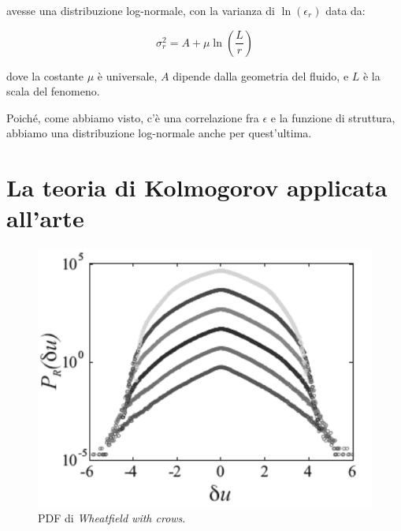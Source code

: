 \documentclass[12pt,a4paper]{article}
\numberwithin{equation}{section}
\begin{document}
avesse una distribuzione log-normale, con la varianza di $\ln (\epsilon_r)$ data da:

\begin{equation}
\sigma ^2 _r = A + \mu \ln \left(
\frac{L}{r}
\right)
\end{equation}

dove la costante $\mu$ è universale, $A$ dipende dalla geometria del fluido, e $L$ è la scala del fenomeno. 

Poiché, come abbiamo visto, c'è una correlazione fra $\epsilon$ e la funzione di struttura, abbiamo una distribuzione log-normale anche per quest'ultima.

\section{La teoria di Kolmogorov applicata all'arte}

\begin{figure}
    \centering
    \includegraphics[scale=0.4]{PDF_wheat.png}
    \caption{PDF di \emph{Wheatfield with crows}.}
    \label{wheatfieldpdf}
\end{figure}
\end{document}

